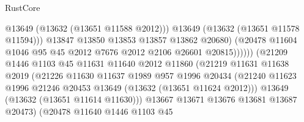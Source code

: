 \begin{lexlean}{RustCore}
\begin{coremodule}
                                            @13649
                                            (@13632 (@13651 @11588 @2012)))
                                          @13649
                                          (@13632 (@13651 @11578 @11594)))
                                        @13847
                                        @13850
                                        @13853
                                        @13857
                                        @13862
                                        @20680)
                                      (@20478
                                        @11604
                                        @1046
                                        @95
                                        @45
                                        @2012
                                        @7676
                                        @2012
                                        @2106
                                        @26601
                                        @20815))))))
                            (@21209
                              @1446
                              @1103
                              @45
                              @11631
                              @11640
                              @2012
                              @11860
                              (@21219
                                @11631
                                @11638
                                @2019
                                (@21226
                                  @11630
                                  @11637
                                  @1989
                                  @957
                                  @1996
                                  @20434
                                  (@21240
                                    @11623
                                    @1996
                                    @21246
                                    @20453
                                    @13649
                                    (@13632 (@13651 @11624 @2012)))
                                  @13649
                                  (@13632 (@13651 @11614 @11630)))
                                @13667
                                @13671
                                @13676
                                @13681
                                @13687
                                @20473)
                              (@20478
                                @11640
                                @1446
                                @1103
                                @45

\end{coremodule}
\end{lexlean}
